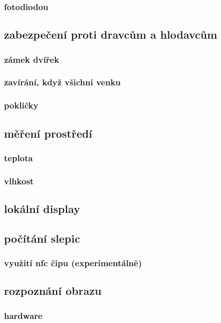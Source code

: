 \documentclass[
program=itp,
  biblatex,
  figures=false,
  glossaries,
  index
]{kidiplom}
\begin{document}
\subsubsection{fotodiodou}

\subsection{zabezpečení proti dravcům a hlodavcům}
\subsubsection{zámek dvířek}
\subsubsection{zavírání, když všichni venku}
\subsubsection{pokličky}

\subsection{měření prostředí}
\subsubsection{teplota}
\subsubsection{vlhkost}

\subsection{lokální display}
\subsection{počítání slepic}
\subsubsection{využití nfc čipu (experimentálně)}
\subsection{rozpoznání obrazu}
\subsubsection{hardware}
\end{document}
